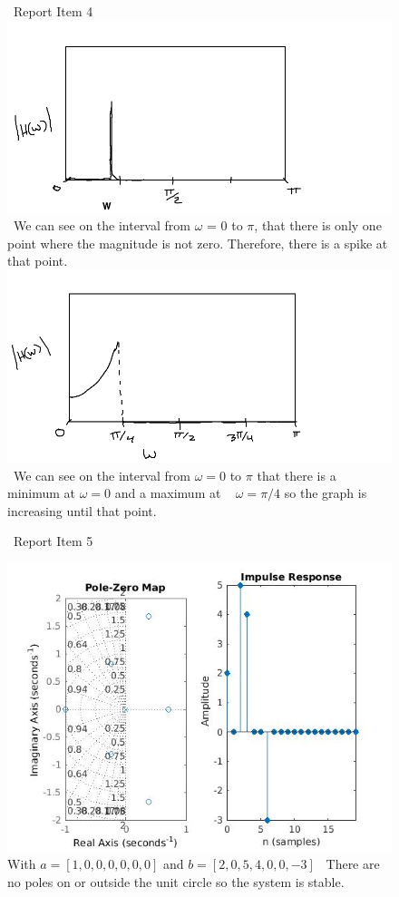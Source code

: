\documentclass{article}
\begin{document}
\begin{figure}[H]
\ Report Item 4
\includegraphics[scale = .5]{report4_1}
\ We can see on the interval from $\omega$ = $0$ to $\pi$, that there is only one point where the magnitude is not zero. Therefore, there is a spike at that point.
\includegraphics[scale = .5]{report4_2}
\ We can see on the interval from $\omega = 0$ to $\pi $ that there is a minimum at $\omega = 0$ and a maximum at ~ $\omega = \pi/4$ so the graph is increasing until that point.
\end{figure}

\begin{figure}[H]
\ Report Item 5

\includegraphics[scale = .5]{report5_1}
\\ With $a = [1,0,0,0,0,0,0]$ and $b =[2,0,5,4,0,0,-3]$
\ There are no poles on or outside the unit circle so the system is stable.
\end{figure}
\end{document}
